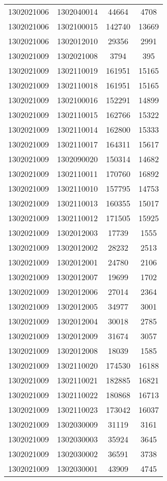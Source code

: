\begin{longtable}{llcc}
1302021006 & 1302040014 & 44664 & 4708\\
1302021006 & 1302100015 & 142740 & 13669\\
1302021006 & 1302012010 & 29356 & 2991\\
1302021009 & 1302021008 & 3794 & 395\\
1302021009 & 1302110019 & 161951 & 15165\\
1302021009 & 1302110018 & 161951 & 15165\\
1302021009 & 1302100016 & 152291 & 14899\\
1302021009 & 1302110015 & 162766 & 15322\\
1302021009 & 1302110014 & 162800 & 15333\\
1302021009 & 1302110017 & 164311 & 15617\\
1302021009 & 1302090020 & 150314 & 14682\\
1302021009 & 1302110011 & 170760 & 16892\\
1302021009 & 1302110010 & 157795 & 14753\\
1302021009 & 1302110013 & 160355 & 15017\\
1302021009 & 1302110012 & 171505 & 15925\\
1302021009 & 1302012003 & 17739 & 1555\\
1302021009 & 1302012002 & 28232 & 2513\\
1302021009 & 1302012001 & 24780 & 2106\\
1302021009 & 1302012007 & 19699 & 1702\\
1302021009 & 1302012006 & 27014 & 2364\\
1302021009 & 1302012005 & 34977 & 3001\\
1302021009 & 1302012004 & 30018 & 2785\\
1302021009 & 1302012009 & 31674 & 3057\\
1302021009 & 1302012008 & 18039 & 1585\\
1302021009 & 1302110020 & 174530 & 16188\\
1302021009 & 1302110021 & 182885 & 16821\\
1302021009 & 1302110022 & 180868 & 16713\\
1302021009 & 1302110023 & 173042 & 16037\\
1302021009 & 1302030009 & 31119 & 3161\\
1302021009 & 1302030003 & 35924 & 3645\\
1302021009 & 1302030002 & 36591 & 3738\\
1302021009 & 1302030001 & 43909 & 4745\\

\end{longtable}
